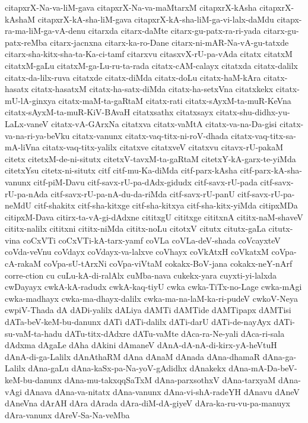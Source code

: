 {citapxrX-Na-va-liM-gava
citapxrX-Na-va-maMtarxM
citapxrX-kAsha
citapxrX-kAshaM
citapxrX-kA-sha-liM-gava
citapxrX-kA-sha-liM-ga-vi-lalx-daMdu
citapx-ra-ma-liM-ga-vA-denu
citarxda
citarx-daMte
citarx-gu-patx-ra-ri-yada
citarx-gu-patx-reMba
citarx-jacnxna
citarx-ka-ro-Dane
citarx-ni-mAR-Na-vA-gu-tatxde
citarx-sha-kitx-sha-ta-Ka-ci-tamf
citarxvu
citasxvX-rU-pa-vAda
citatx
citatxM
citatxM-gaLu
citatxM-ga-Lu-ru-ta-rada
citatx-cAM-calayx
citatxda
citatx-dalilx
citatx-da-lilx-ruva
citatxde
citatx-diMda
citatx-doLu
citatx-haM-kAra
citatx-hasatx
citatx-hasatxM
citatx-ha-satx-diMda
citatx-ha-setxVna
citatxkekx
citatx-mU-lA-ginxya
citatx-maM-ta-gaRtaM
citatx-rati
citatx-sAyxM-ta-muR-KeVna
citatx-sAyxM-ta-muR-KiV-BAvaH
citatxsathx
citatxsayx
citatx-shu-didhx-yu-LaLx-vaneV
citatx-vA-GArxNa
citatxva
citatx-vaMtA
citatx-va-na-Da-gisi
citatx-va-na-ri-ya-beVku
citatx-vanunx
citatx-vaq-titx-ni-roV-dhada
citatx-vaq-titx-sa-mA-liVna
citatx-vaq-titx-yalilx
citatxve
citatxveV
citatxvu
citavx-rU-pakaM
citetx
citetxM-de-ni-situtx
citetxV-tavxM-ta-gaRtaM
citetxY-kA-garx-te-yiMda
citetxYsu
citetx-ni-situtx
citf
citf-mu-Ka-diMda
citf-parx-kAsha
citf-parx-kA-sha-vanunx
citf-piM-Davu
citf-savx-rU-pa-dAdx-gidudx
citf-savx-rU-pada
citf-savx-rU-pa-nAda
citf-savx-rU-pa-nA-du-da-riMda
citf-savx-rU-panU
citf-savx-rU-pa-neMdU
citf-shakitx
citf-sha-kitxge
citf-sha-kitxya
citf-sha-kitx-yiMda
citipxMDa
citipxM-Dava
citirx-ta-vA-gi-dAdxne
cititxgU
cititxge
cititxnA
cititx-naM-shaveV
cititx-nalilx
cititxni
cititx-niMda
cititx-noLu
citotxV
citutx
citutx-gaLa
citutx-vina
coCxVTi
coCxVTi-kA-tarx-yamf
coVLa
coVLa-deV-shada
coVcayxteV
coVda-veVnu
coVdayx
coVdayx-va-lalxve
coVhayx
coVkAtxH
coVkatxM
coVpa-cA-rakaM
coVpa-sU-tArxNi
coVpa-viVtaM
cokakx-BoV-jana
cokakx-neY-nArf
corre-ction
cu
cuLu-kA-di-ralAlx
cuMba-nava
cukekx-yara
cuyxti-yi-lalxda
cwDayayx
cwkA-kA-radudx
cwkA-kaq-tiyU
cwka
cwka-TiTx-no-Lage
cwka-mAgi
cwka-madhayx
cwka-ma-dhayx-dalilx
cwka-ma-na-laM-ka-ri-pudeV
cwkoV-Neya
cwpiV-Thada
dA
dADi-yalilx
dALiya
dAMTi
dAMTide
dAMTipapx
dAMTisi
dATa-beV-keM-bu-danunx
dATi
dATi-dalilx
dATi-darU
dATi-de-nayAyx
dATi-su-vaM-ta-hadu
dATu-titx-dAdxre
dATu-vaMte
dAca-ra-Ne-yali
dAca-ri-sala
dAdxma
dAgaLe
dAha
dAkini
dAmaneV
dAnA-dA-nA-di-kirx-yA-heVtuH
dAnA-di-ga-Lalilx
dAnAthaRM
dAna
dAnaM
dAnada
dAna-dhamaR
dAna-ga-Lalilx
dAna-gaLu
dAna-kaSx-pa-Na-yoV-gAdidhx
dAnakekx
dAna-mA-Da-beV-keM-bu-danunx
dAna-mu-takxqqSaTxM
dAna-parxsothxV
dAna-tarxyaM
dAna-vAgi
dAnava
dAna-va-nitatx
dAna-vanunx
dAna-vi-shA-radeYH
dAnavu
dAneV
dAneVna
dArAH
dAra
dArada
dAra-diM-dA-giyeV
dAra-ka-ru-vu-pa-manuyx
dAra-vanunx
dAreV-Sa-Na-veMba
}

